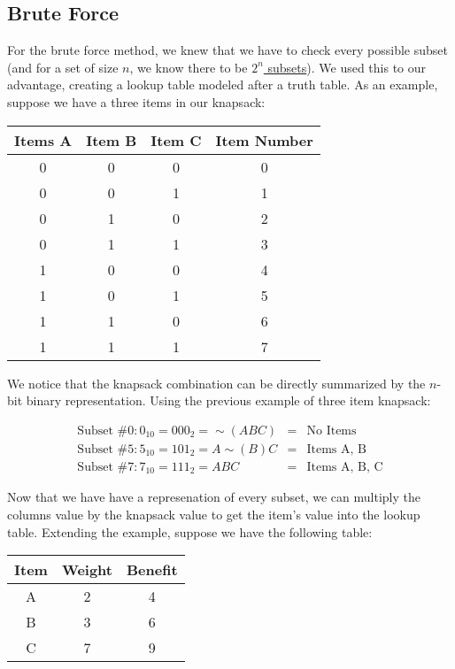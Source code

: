 \documentclass{article}
\begin{document}
\subsection{Brute Force}
For the brute force method, we knew that we have to check every possible subset (and for a set of size $n$, we know there to be \href{http://mathworld.wolfram.com/Subset.html}{$2^n$ subsets}). We used this to our advantage, creating a lookup table modeled after a truth table. As an example, suppose we have a three items in our knapsack:

\begin{center}
    \begin{tabular}{|c|c|c|c|}
        \hline
        Items A & Item B & Item C & Item Number  \\ \hline
        0 & 0 & 0 & 0\\
        0 & 0 & 1 & 1\\
        0 & 1 & 0 & 2\\
        0 & 1 & 1 & 3\\
        1 & 0 & 0 & 4\\
        1 & 0 & 1 & 5\\
        1 & 1 & 0 & 6\\
        1 & 1 & 1 & 7\\
        \hline
    \end{tabular}
\end{center}

We notice that the knapsack combination can be directly summarized by the $n$-bit binary representation. Using the previous example of three item knapsack:

\begin{eqnarray}
    \text{Subset \#0}: 0_{10} = 000_{2} = \sim(ABC) & = & \text{No Items} \\
    \text{Subset \#5}: 5_{10} = 101_{2} = A\sim(B)C & = & \text{Items A, B} \\
    \text{Subset \#7}: 7_{10} = 111_{2} = ABC & = & \text{Items A, B, C}
\end{eqnarray}

Now that we have have a represenation of every subset, we can multiply the columns value by the knapsack value to get the item's value into the lookup table. Extending the example, suppose we have the following table:

\begin{center}
    \begin{tabular}{|c|c|c|}
        \hline
        Item & Weight & Benefit \\ \hline
        A & 2 & 4 \\
        B & 3 & 6 \\
        C & 7 & 9 \\
        \hline
    \end{tabular}
\end{center}
\end{document}
